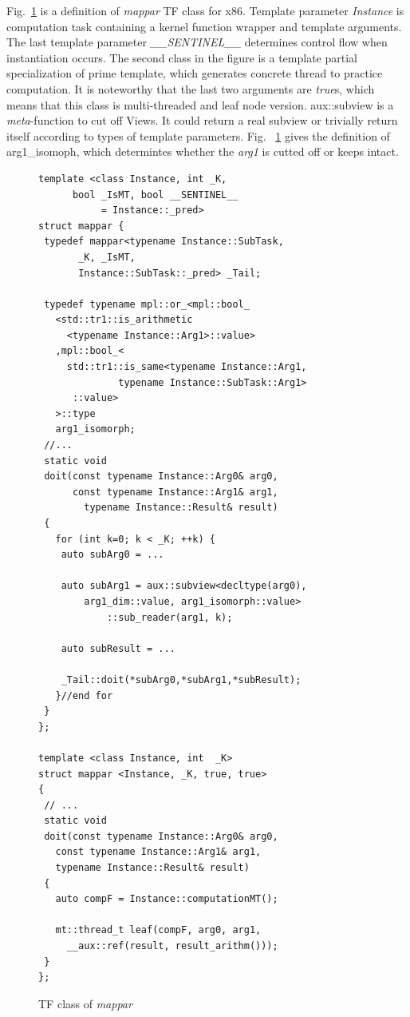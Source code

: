 \documentclass[10pt, conference, compsocconf]{IEEEtran}
\begin{document}
Fig.~\ref{lst:mappar} is a definition of \emph{mappar} TF
class for x86. Template parameter \emph{Instance} is computation task
containing a kernel function wrapper and template arguments. The last template
parameter \emph{\_\_SENTINEL\_\_} determines control flow when
instantiation occurs. The second class in the figure is a template partial
specialization of prime template, which generates concrete thread
to practice computation. It is noteworthy that the last two arguments
are \emph{true}s, which means that this class is multi-threaded and
leaf node version. aux::subview is a \emph{meta}-function to cut off
Views. It could return a real subview or trivially return itself
according to types of template parameters. Fig. ~\ref{lst:mappar} gives the definition of arg1\_isomoph,
which determintes whether the \textit{arg1} is cutted off or keeps intact.

\begin{figure}[!htp]
\begin{minipage}[tb]{\linewidth}
\makebox[\textwidth]{\hrulefill}
\begin{small}
\begin{verbatim}
template <class Instance, int _K,
      bool _IsMT, bool __SENTINEL__ 
           = Instance::_pred>
struct mappar {
 typedef mappar<typename Instance::SubTask, 
       _K, _IsMT, 
       Instance::SubTask::_pred> _Tail;

 typedef typename mpl::or_<mpl::bool_
   <std::tr1::is_arithmetic
     <typename Instance::Arg1>::value>
   ,mpl::bool_<
     std::tr1::is_same<typename Instance::Arg1, 
              typename Instance::SubTask::Arg1>
      ::value>
   >::type
   arg1_isomorph;
 //...
 static void 
 doit(const typename Instance::Arg0& arg0, 
      const typename Instance::Arg1& arg1, 
        typename Instance::Result& result)
 {
   for (int k=0; k < _K; ++k) {
    auto subArg0 = ...
 
    auto subArg1 = aux::subview<decltype(arg0), 
        arg1_dim::value, arg1_isomorph::value>
            ::sub_reader(arg1, k); 
	  
    auto subResult = ...

    _Tail::doit(*subArg0,*subArg1,*subResult);
   }//end for
 }
};

template <class Instance, int  _K>
struct mappar <Instance, _K, true, true> 
{
 // ...
 static void 
 doit(const typename Instance::Arg0& arg0, 
   const typename Instance::Arg1& arg1,
   typename Instance::Result& result)
 {
   auto compF = Instance::computationMT();

   mt::thread_t leaf(compF, arg0, arg1, 
     __aux::ref(result, result_arithm()));
 }
};

\end{verbatim}
\end{small}
\vspace{-1ex}\makebox[\textwidth]{\hrulefill}
\end{minipage}
\caption{TF class of \textsl{mappar}}\label{lst:mappar}
\end{figure}
\end{document}
